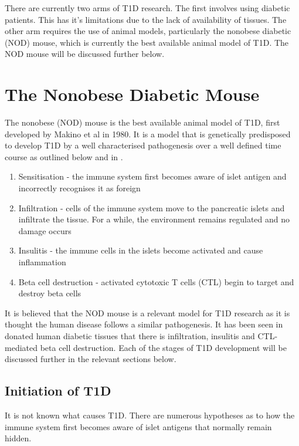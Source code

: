 There are currently two arms of T1D research.
The first involves using diabetic patients.
This has it's limitations due to the lack of availability of tissues.
The other arm requires the use of animal models, particularly the nonobese diabetic (NOD) mouse, which is currently the best available animal model of T1D.
The NOD mouse will be discussed further below.




\section{The Nonobese Diabetic Mouse}

The nonobese (NOD) mouse is the best available animal model of T1D, first developed by Makino et al  in 1980.
It is a model that is genetically predisposed to develop T1D by a well characterised pathogenesis over a well defined time course as outlined below and in .

\begin{enumerate}
\item Sensitisation - the immune system first becomes aware of islet antigen and incorrectly recognises it as foreign
\item Infiltration - cells of the immune system move to the pancreatic islets and infiltrate the tissue. For a while, the environment remains regulated and no damage occurs
\item Insulitis - the immune cells in the islets become activated and cause inflammation
\item Beta cell destruction - activated cytotoxic T cells (CTL) begin to target and destroy beta cells
\end{enumerate}

It is believed that the NOD mouse is a relevant model for T1D research as it is thought the human disease follows a similar pathogenesis.
It has been seen in donated human diabetic tissues that there is infiltration, insulitis and CTL-mediated beta cell destruction.
Each of the stages of T1D development will be discussed further in the relevant sections below.


\subsection{Initiation of T1D}

It is not known what causes T1D.
There are numerous hypotheses as to how the immune system first becomes aware of islet antigens that normally remain hidden.


